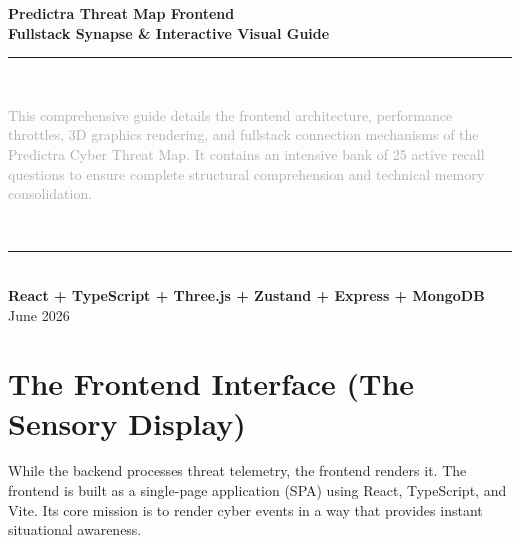 \documentclass[11pt,a4paper]{report}
\begin{document}
\begin{titlepage}
  \centering
  \vspace*{2cm}
  {\Huge \bfseries \color{primary} Predictra Threat Map Frontend} \\[0.5cm]
  {\Large \bfseries \color{secondary} Fullstack Synapse \& Interactive Visual Guide} \\[1.5cm]
  
  \rule{\textwidth}{1pt} \\[1.5cm]
  
  \begin{minipage}{0.8\textwidth}
    \centering
    \large \textcolor{darkgray}{
      This comprehensive guide details the frontend architecture, performance throttles, 3D graphics rendering, and fullstack connection mechanisms of the Predictra Cyber Threat Map. It contains an intensive bank of 25 active recall questions to ensure complete structural comprehension and technical memory consolidation.
    }
  \end{minipage} \\[1.5cm]
  
  \rule{\textwidth}{1pt} \\[2cm]
  
  {\large \bfseries React + TypeScript + Three.js + Zustand + Express + MongoDB} \\[0.2cm]
  {\large June 2026}
  
  \vfill
\end{titlepage}

\tableofcontents
\newpage

\chapter{The Frontend Interface (The Sensory Display)}

While the backend processes threat telemetry, the frontend renders it. The frontend is built as a single-page application (SPA) using React, TypeScript, and Vite. Its core mission is to render cyber events in a way that provides instant situational awareness.
\end{document}
